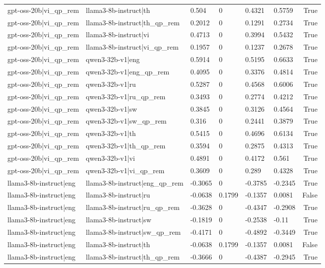 \begin{table}
\begin{tabular}{llllllr}
gpt-oss-20b|vi_qp_rem & llama3-8b-instruct|th & 0.504 & 0 & 0.4321 & 0.5759 & True \\
gpt-oss-20b|vi_qp_rem & llama3-8b-instruct|th_qp_rem & 0.2012 & 0 & 0.1291 & 0.2734 & True \\
gpt-oss-20b|vi_qp_rem & llama3-8b-instruct|vi & 0.4713 & 0 & 0.3994 & 0.5432 & True \\
gpt-oss-20b|vi_qp_rem & llama3-8b-instruct|vi_qp_rem & 0.1957 & 0 & 0.1237 & 0.2678 & True \\
gpt-oss-20b|vi_qp_rem & qwen3-32b-v1|eng & 0.5914 & 0 & 0.5195 & 0.6633 & True \\
gpt-oss-20b|vi_qp_rem & qwen3-32b-v1|eng_qp_rem & 0.4095 & 0 & 0.3376 & 0.4814 & True \\
gpt-oss-20b|vi_qp_rem & qwen3-32b-v1|ru & 0.5287 & 0 & 0.4568 & 0.6006 & True \\
gpt-oss-20b|vi_qp_rem & qwen3-32b-v1|ru_qp_rem & 0.3493 & 0 & 0.2774 & 0.4212 & True \\
gpt-oss-20b|vi_qp_rem & qwen3-32b-v1|sw & 0.3845 & 0 & 0.3126 & 0.4564 & True \\
gpt-oss-20b|vi_qp_rem & qwen3-32b-v1|sw_qp_rem & 0.316 & 0 & 0.2441 & 0.3879 & True \\
gpt-oss-20b|vi_qp_rem & qwen3-32b-v1|th & 0.5415 & 0 & 0.4696 & 0.6134 & True \\
gpt-oss-20b|vi_qp_rem & qwen3-32b-v1|th_qp_rem & 0.3594 & 0 & 0.2875 & 0.4313 & True \\
gpt-oss-20b|vi_qp_rem & qwen3-32b-v1|vi & 0.4891 & 0 & 0.4172 & 0.561 & True \\
gpt-oss-20b|vi_qp_rem & qwen3-32b-v1|vi_qp_rem & 0.3609 & 0 & 0.289 & 0.4328 & True \\
llama3-8b-instruct|eng & llama3-8b-instruct|eng_qp_rem & -0.3065 & 0 & -0.3785 & -0.2345 & True \\
llama3-8b-instruct|eng & llama3-8b-instruct|ru & -0.0638 & 0.1799 & -0.1357 & 0.0081 & False \\
llama3-8b-instruct|eng & llama3-8b-instruct|ru_qp_rem & -0.3628 & 0 & -0.4347 & -0.2908 & True \\
llama3-8b-instruct|eng & llama3-8b-instruct|sw & -0.1819 & 0 & -0.2538 & -0.11 & True \\
llama3-8b-instruct|eng & llama3-8b-instruct|sw_qp_rem & -0.4171 & 0 & -0.4892 & -0.3449 & True \\
llama3-8b-instruct|eng & llama3-8b-instruct|th & -0.0638 & 0.1799 & -0.1357 & 0.0081 & False \\
llama3-8b-instruct|eng & llama3-8b-instruct|th_qp_rem & -0.3666 & 0 & -0.4387 & -0.2945 & True \\

\end{tabular}
\end{table}
